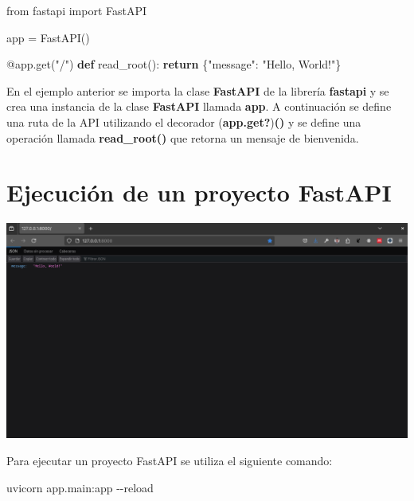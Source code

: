 \documentclass[
  a4paper,
  DIV=11,
  numbers=noendperiod,
  onepage,
  openany]{scrreprt}
\newenvironment{Shaded}{\begin{snugshade}}{\end{snugshade}}
\newcommand{\AttributeTok}[1]{\textcolor[rgb]{0.40,0.45,0.13}{#1}}
\newcommand{\ControlFlowTok}[1]{\textcolor[rgb]{0.00,0.23,0.31}{\textbf{#1}}}
\newcommand{\ExtensionTok}[1]{\textcolor[rgb]{0.00,0.23,0.31}{#1}}
\newcommand{\ImportTok}[1]{\textcolor[rgb]{0.00,0.46,0.62}{#1}}
\newcommand{\KeywordTok}[1]{\textcolor[rgb]{0.00,0.23,0.31}{\textbf{#1}}}
\newcommand{\NormalTok}[1]{\textcolor[rgb]{0.00,0.23,0.31}{#1}}
\newcommand{\OperatorTok}[1]{\textcolor[rgb]{0.37,0.37,0.37}{#1}}
\newcommand{\StringTok}[1]{\textcolor[rgb]{0.13,0.47,0.30}{#1}}
\begin{document}
\begin{Shaded}
\begin{Highlighting}[]
\ImportTok{from}\NormalTok{ fastapi }\ImportTok{import}\NormalTok{ FastAPI}

\NormalTok{app }\OperatorTok{=}\NormalTok{ FastAPI()}

\AttributeTok{@app.get}\NormalTok{(}\StringTok{"/"}\NormalTok{)}
\KeywordTok{def}\NormalTok{ read\_root():}
    \ControlFlowTok{return}\NormalTok{ \{}\StringTok{"message"}\NormalTok{: }\StringTok{"Hello, World!"}\NormalTok{\}}
\end{Highlighting}
\end{Shaded}

En el ejemplo anterior se importa la clase \textbf{FastAPI} de la
librería \textbf{fastapi} y se crea una instancia de la clase
\textbf{FastAPI} llamada \textbf{app}. A continuación se define una ruta
de la API utilizando el decorador (\textbf{app.get?})\textbf{()} y se
define una operación llamada \textbf{read\_root()} que retorna un
mensaje de bienvenida.

\section{Ejecución de un proyecto
FastAPI}\label{ejecuciuxf3n-de-un-proyecto-fastapi}

\includegraphics{unidades/unidad5/images/paste-17.png}

Para ejecutar un proyecto FastAPI se utiliza el siguiente comando:

\begin{Shaded}
\begin{Highlighting}[]
\ExtensionTok{uvicorn}\NormalTok{ app.main:app }\AttributeTok{{-}{-}reload}
\end{Highlighting}
\end{Shaded}
\end{document}
